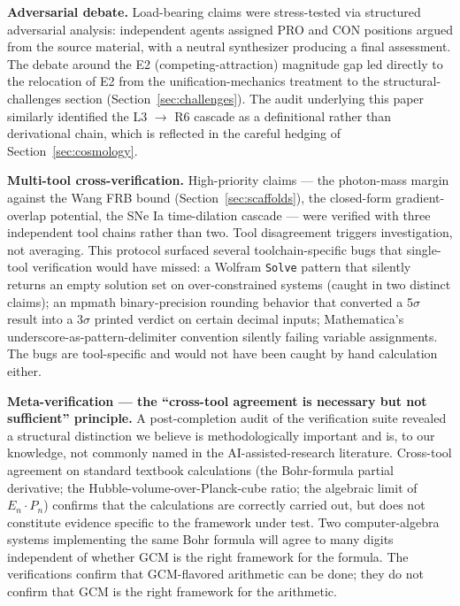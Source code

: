 \documentclass[12pt]{article}
\theoremstyle{definition}
\theoremstyle{remark}
\begin{document}
\textbf{Adversarial debate.} Load-bearing claims were stress-tested via structured adversarial analysis: independent agents assigned PRO and CON positions argued from the source material, with a neutral synthesizer producing a final assessment. The debate around the E2 (competing-attraction) magnitude gap led directly to the relocation of E2 from the unification-mechanics treatment to the structural-challenges section (Section~\ref{sec:challenges}). The audit underlying this paper similarly identified the L3 $\to$ R6 cascade as a definitional rather than derivational chain, which is reflected in the careful hedging of Section~\ref{sec:cosmology}.

\textbf{Multi-tool cross-verification.} High-priority claims --- the photon-mass margin against the Wang FRB bound (Section~\ref{sec:scaffolds}), the closed-form gradient-overlap potential, the SNe Ia time-dilation cascade --- were verified with three independent tool chains rather than two. Tool disagreement triggers investigation, not averaging. This protocol surfaced several toolchain-specific bugs that single-tool verification would have missed: a Wolfram \texttt{Solve} pattern that silently returns an empty solution set on over-constrained systems (caught in two distinct claims); an mpmath binary-precision rounding behavior that converted a 5$\sigma$ result into a 3$\sigma$ printed verdict on certain decimal inputs; Mathematica's underscore-as-pattern-delimiter convention silently failing variable assignments. The bugs are tool-specific and would not have been caught by hand calculation either.

\textbf{Meta-verification --- the ``cross-tool agreement is necessary but not sufficient'' principle.} A post-completion audit of the verification suite revealed a structural distinction we believe is methodologically important and is, to our knowledge, not commonly named in the AI-assisted-research literature. Cross-tool agreement on standard textbook calculations (the Bohr-formula partial derivative; the Hubble-volume-over-Planck-cube ratio; the algebraic limit of $E_n \cdot P_n$) confirms that the calculations are correctly carried out, but does not constitute evidence specific to the framework under test. Two computer-algebra systems implementing the same Bohr formula will agree to many digits independent of whether GCM is the right framework for the formula. The verifications confirm that GCM-flavored arithmetic can be done; they do not confirm that GCM is the right framework for the arithmetic.
\end{document}
